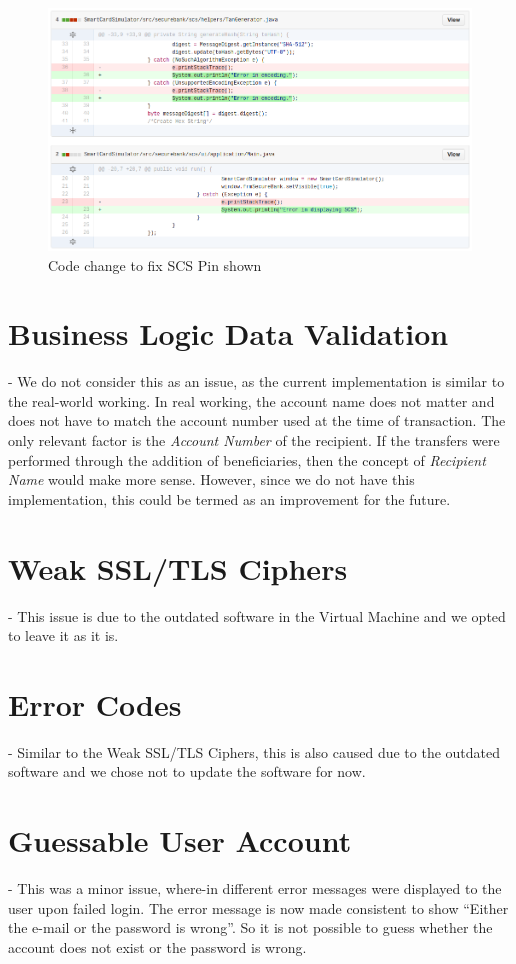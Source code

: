 \begin{figure}[ht]
	\centering
	\includegraphics[width=.8\linewidth]{figures/fix_scs_pin_shown.png}
	\caption{Code change to fix SCS Pin shown}
	\label{fig:fix_scs_pin_shown}
\end{figure}

\clearpage 

\section{Business Logic Data Validation} - We do not consider this as an issue, as the current implementation is similar to the real-world working. In real working, the account name does not matter and does not  have to match the account number used at the time of transaction. The only relevant factor is the \textit{Account Number} of the recipient.
If the transfers were performed through the addition of beneficiaries, then the concept of \textit{Recipient Name} would make more sense. However, since we do not have this implementation, this could be termed as an improvement for the future.

\section{Weak SSL/TLS Ciphers} - This issue is due to the outdated software in the Virtual Machine and we opted to leave it as it is.

\section{Error Codes} - Similar to the Weak SSL/TLS Ciphers, this is also caused due to the outdated software and we chose not to update the software for now.

\section{Guessable User Account} - This was a minor issue, where-in different error messages were displayed to the user upon failed login. The error message is now made consistent to show \enquote{Either the e-mail or the password is wrong}. So it is not possible to guess whether the account does not exist or the password is wrong.

